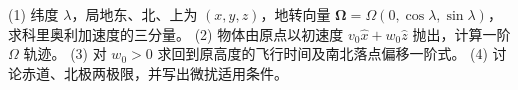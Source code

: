 (1) 纬度 \(\lambda\)，局地东、北、上为 \((x,y,z)\)，地转向量 \(\boldsymbol\Omega=\Omega(0,\cos\lambda,\sin\lambda)\)，求科里奥利加速度的三分量。
(2) 物体由原点以初速度 \(v_0\hat x+w_0\hat z\) 抛出，计算一阶 \(\Omega\) 轨迹。
(3) 对 \(w_0>0\) 求回到原高度的飞行时间及南北落点偏移一阶式。
(4) 讨论赤道、北极两极限，并写出微扰适用条件。
